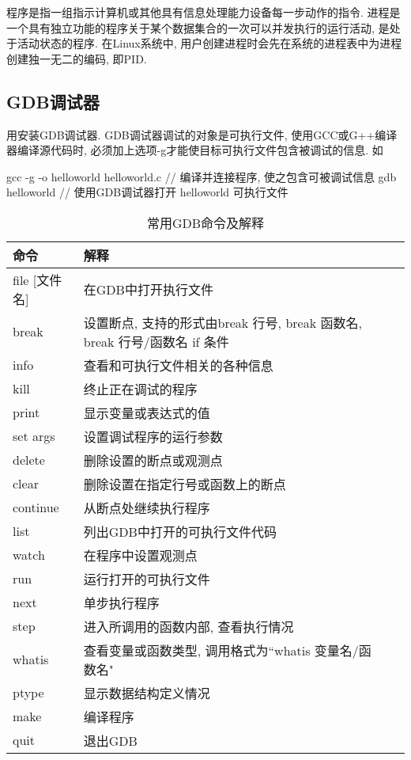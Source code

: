 程序是指一组指示计算机或其他具有信息处理能力设备每一步动作的指令.
进程是一个具有独立功能的程序关于某个数据集合的一次可以并发执行的运行活动, 
是处于活动状态的程序. 
在Linux系统中, 用户创建进程时会先在系统的进程表中为进程创建独一无二的编码,
即PID.


\subsection{GDB调试器}
用安装GDB调试器.
GDB调试器调试的对象是可执行文件, 使用GCC或G++编译器编译源代码时, 
必须加上选项-g才能使目标可执行文件包含被调试的信息. 如
\begin{shell}
 gcc -g -o helloworld helloworld.c // 编译并连接程序, 使之包含可被调试信息
 gdb helloworld // 使用GDB调试器打开 helloworld 可执行文件
\end{shell}

\begin{table}[H]
 \small %
\sffamily %
\centering %
\renewcommand{\arraystretch}{1.4} %
\caption{常用GDB命令及解释}
\begin{tabular}{*{2}{l|l}}
 \hline
 \bfseries 命令 & \bfseries 解释\\ \hline
 file [文件名] & 在GDB中打开执行文件\\ \hline
 break & 设置断点, 支持的形式由break 行号, break 函数名, break 行号/函数名 if 条件\\ \hline
 info & 查看和可执行文件相关的各种信息\\ \hline
 kill & 终止正在调试的程序\\ \hline
 print & 显示变量或表达式的值\\ \hline
 set args & 设置调试程序的运行参数\\ \hline
 delete & 删除设置的断点或观测点\\ \hline
 clear & 删除设置在指定行号或函数上的断点\\ \hline
 continue & 从断点处继续执行程序\\ \hline
 list & 列出GDB中打开的可执行文件代码\\ \hline
 watch & 在程序中设置观测点\\ \hline
 run & 运行打开的可执行文件\\ \hline
 next & 单步执行程序\\ \hline
 step & 进入所调用的函数内部, 查看执行情况\\ \hline
 whatis & 查看变量或函数类型, 调用格式为``whatis 变量名/函数名"\\ \hline
 ptype & 显示数据结构定义情况\\ \hline
 make & 编译程序\\ \hline
 quit & 退出GDB\\ \hline
\end{tabular}
\end{table}

